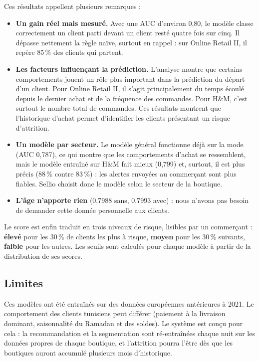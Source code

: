 Ces résultats appellent plusieurs remarques :
\begin{itemize}
  \item \textbf{Un gain réel mais mesuré.} Avec une AUC d'environ 0,80, le modèle classe correctement un client parti devant un client resté quatre fois sur cinq. Il dépasse nettement la règle naïve, surtout en rappel : sur Online Retail II, il repère 85\,\% des clients qui partent.
\item \textbf{Les facteurs influençant la prédiction.}
L'analyse montre que certains comportements jouent un rôle plus important dans la prédiction du départ d'un client. Pour Online Retail II, il s'agit principalement du temps écoulé depuis le dernier achat et de la fréquence des commandes. Pour H\&M, c'est surtout le nombre total de commandes. Ces résultats montrent que l'historique d'achat permet d'identifier les clients présentant un risque d'attrition.

  \item \textbf{Un modèle par secteur.} Le modèle général fonctionne déjà sur la mode (AUC 0,787), ce qui montre que les comportements d'achat se ressemblent, mais le modèle entraîné sur H\&M fait mieux (0,799) et, surtout, il est plus précis (88\,\% contre 83\,\%) : les alertes envoyées au commerçant sont plus fiables. Sellio choisit donc le modèle selon le secteur de la boutique.
  \item \textbf{L'âge n'apporte rien} (0,7988 sans, 0,7993 avec) : nous n'avons pas besoin de demander cette donnée personnelle aux clients.
\end{itemize}
Le score est enfin traduit en trois niveaux de risque, lisibles par un commerçant : \textbf{élevé} pour les 30\,\% de clients les plus à risque, \textbf{moyen} pour les 30\,\% suivants, \textbf{faible} pour les autres. Les seuils sont calculés pour chaque modèle à partir de la distribution de ses scores.

\subsection{Limites}
Ces modèles ont été entraînés sur des données européennes antérieures à 2021. Le comportement des clients tunisiens peut différer (paiement à la livraison dominant, saisonnalité du Ramadan et des soldes). Le système est conçu pour cela : la recommandation et la segmentation sont ré-entraînées chaque nuit sur les données propres de chaque boutique, et l'attrition pourra l'être dès que les boutiques auront accumulé plusieurs mois d'historique.


